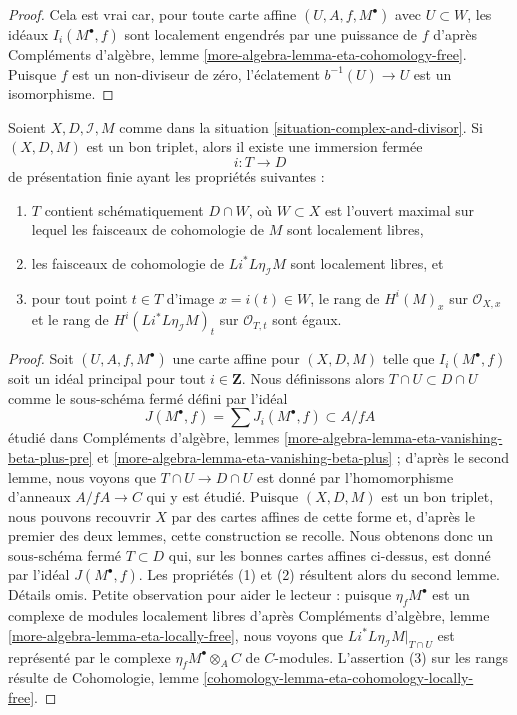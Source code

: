 \begin{proof}
Cela est vrai car, pour toute carte affine $(U, A, f, M^\bullet)$
avec $U \subset W$, les idéaux $I_i(M^\bullet, f)$ sont localement
engendrés par une puissance de $f$ d'après
Compléments d'algèbre, lemme \ref{more-algebra-lemma-eta-cohomology-free}.
Puisque $f$ est un non-diviseur de zéro,
l'éclatement $b^{-1}(U) \to U$ est un isomorphisme.
\end{proof}

\begin{lemma}
\label{lemma-complex-and-divisor-blowup-good-T}
Soient $X, D, \mathcal{I}, M$ comme dans la
situation \ref{situation-complex-and-divisor}.
Si $(X, D, M)$ est un bon triplet, alors il existe une
immersion fermée
$$
i : T \longrightarrow D
$$
de présentation finie ayant les propriétés suivantes :
\begin{enumerate}
\item $T$ contient schématiquement $D \cap W$,
où $W \subset X$ est l'ouvert maximal sur lequel les
faisceaux de cohomologie de $M$ sont localement libres,
\item les faisceaux de cohomologie de $Li^*L\eta_\mathcal{I}M$
sont localement libres, et
\item pour tout point $t \in T$ d'image $x = i(t) \in W$, le rang
de $H^i(M)_x$ sur $\mathcal{O}_{X, x}$ et le rang
de $H^i(Li^*L\eta_\mathcal{I}M)_t$ sur $\mathcal{O}_{T, t}$ sont égaux.
\end{enumerate}
\end{lemma}

\begin{proof}
Soit $(U, A, f, M^\bullet)$ une carte affine pour $(X, D, M)$
telle que $I_i(M^\bullet, f)$ soit un idéal principal pour tout $i \in \mathbf{Z}$.
Nous définissons alors $T \cap U \subset D \cap U$ comme le sous-schéma fermé
défini par l'idéal
$$
J(M^\bullet, f) = \sum J_i(M^\bullet, f) \subset A/fA
$$
étudié dans Compléments d'algèbre, lemmes
\ref{more-algebra-lemma-eta-vanishing-beta-plus-pre} et
\ref{more-algebra-lemma-eta-vanishing-beta-plus} ;
d'après le second lemme, nous voyons que $T \cap U \to D \cap U$
est donné par l'homomorphisme d'anneaux $A/fA \to C$ qui y est étudié.
Puisque $(X, D, M)$ est un bon triplet, nous pouvons recouvrir $X$ par
des cartes affines de cette forme et, d'après le premier des deux
lemmes, cette construction se recolle. Nous obtenons donc un sous-schéma
fermé $T \subset D$ qui, sur les bonnes cartes affines ci-dessus,
est donné par l'idéal $J(M^\bullet, f)$. Les propriétés
(1) et (2) résultent alors du second lemme. Détails omis.
Petite observation pour aider le lecteur :
puisque $\eta_fM^\bullet$ est un complexe de modules localement libres
d'après Compléments d'algèbre, lemme \ref{more-algebra-lemma-eta-locally-free},
nous voyons que $Li^*L\eta_\mathcal{I}M|_{T \cap U}$
est représenté par le complexe $\eta_fM^\bullet \otimes_A C$
de $C$-modules. L'assertion (3) sur les rangs résulte de
Cohomologie, lemme \ref{cohomology-lemma-eta-cohomology-locally-free}.
\end{proof}

